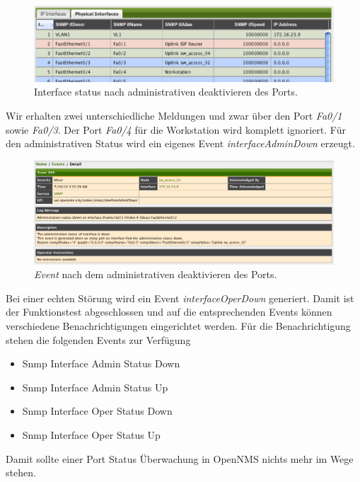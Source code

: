 \begin{figure}[H]
	\centering
	\includegraphics[width=1.0\textwidth]{images/use-cases/monitoring-layer-2/port-admin-down}
	\caption{Interface status nach administrativen deaktivieren des Ports.}
	\label{pic:port-admin-down}
\end{figure}

Wir erhalten zwei unterschiedliche Meldungen und zwar über den Port \emph{Fa0/1} sowie \emph{Fa0/3}. Der Port \emph{Fa0/4} für die Workstation wird komplett ignoriert. Für den administrativen Status wird ein eigenes Event \emph{interfaceAdminDown} erzeugt.

\begin{figure}[H]
	\centering
	\includegraphics[width=1.0\textwidth]{images/use-cases/monitoring-layer-2/port-admin-down-event}
	\caption{\emph{Event} nach dem administrativen deaktivieren des Ports.}
	\label{pic:port-admin-down-event}
\end{figure}

Bei einer echten Störung wird ein Event \emph{interfaceOperDown} generiert. Damit ist der Funktionstest abgeschlossen und auf die entsprechenden Events können verschiedene Benachrichtigungen eingerichtet werden. Für die Benachrichtigung stehen die folgenden Events zur Verfügung

\begin{itemize}
  \item{Snmp Interface Admin Status Down}
  \item{Snmp Interface Admin Status Up}
  \item{Snmp Interface Oper Status Down}
  \item{Snmp Interface Oper Status Up}
\end{itemize}

Damit sollte einer Port Status Überwachung in OpenNMS nichts mehr im Wege stehen.